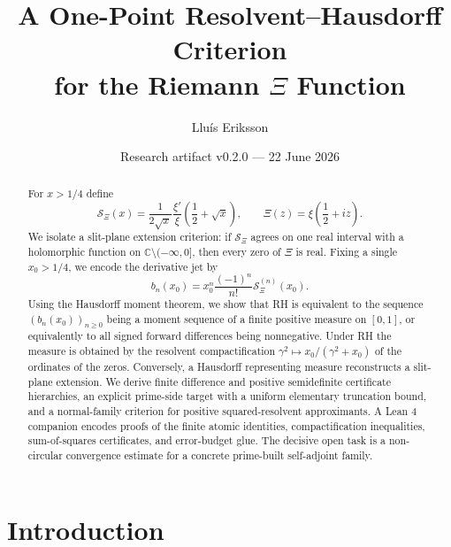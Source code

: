 \documentclass[11pt]{article}
\title{\textbf{A One-Point Resolvent--Hausdorff Criterion\\for the Riemann $\Xi$ Function}}
\author{Lluís Eriksson}
\date{Research artifact v0.2.0 --- 22 June 2026}
\theoremstyle{definition}
\newcommand{\C}{\mathbb C}
\newcommand{\XiR}{\mathcal S_{\Xi}}
\begin{document}
\maketitle

\begin{center}
\end{center}

\begin{abstract}
For $x>1/4$ define
\[
 \XiR(x)=\frac{1}{2\sqrt{x}}\frac{\xi'}{\xi}
 \left(\frac12+\sqrt{x}\right),
 \qquad
 \Xi(z)=\xi\left(\frac12+iz\right).
\]
We isolate a slit-plane extension criterion: if $\XiR$ agrees on one real interval
with a holomorphic function on $\C\setminus(-\infty,0]$, then every zero of $\Xi$
is real. Fixing a single $x_0>1/4$, we encode the derivative jet by
\[
 b_n(x_0)=x_0^n\frac{(-1)^n}{n!}\XiR^{(n)}(x_0).
\]
Using the Hausdorff moment theorem, we show that RH is equivalent to the sequence
$(b_n(x_0))_{n\ge0}$ being a moment sequence of a finite positive measure on $[0,1]$,
or equivalently to all signed forward differences being nonnegative. Under RH the
measure is obtained by the resolvent compactification
$\gamma^2\mapsto x_0/(\gamma^2+x_0)$ of the ordinates of the zeros. Conversely, a
Hausdorff representing measure reconstructs a slit-plane extension. We derive finite
difference and positive semidefinite certificate hierarchies, an explicit prime-side
target with a uniform elementary truncation bound, and a normal-family criterion for
positive squared-resolvent approximants. A Lean 4 companion encodes proofs of the finite atomic
identities, compactification inequalities, sum-of-squares certificates, and error-budget
glue. The decisive open task is a non-circular convergence estimate for a concrete
prime-built self-adjoint family.
\end{abstract}

\tableofcontents

\section{Introduction}
\end{document}
